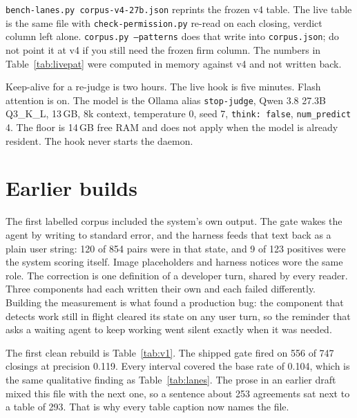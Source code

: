 \texttt{bench-lanes.py corpus-v4-27b.json} reprints the frozen v4
table. The live table is the same file with
\texttt{check-permission.py} re-read on each closing, verdict
column left alone. \texttt{corpus.py --patterns} does that write
into \texttt{corpus.json}; do not point it at v4 if you still need
the frozen firm column. The numbers in Table~\ref{tab:livepat} were
computed in memory against v4 and not written back.

Keep-alive for a re-judge is two hours. The live hook is five
minutes. Flash attention is on. The model is the Ollama alias
\texttt{stop-judge}, Qwen 3.8 27.3B Q3\_K\_L, 13\,GB, 8k context,
temperature 0, seed 7, \texttt{think: false}, \texttt{num\_predict}
4. The floor is 14\,GB free RAM and does not apply when the model
is already resident. The hook never starts the daemon.

\section{Earlier builds}
\label{app:builds}

The first labelled corpus included the system's own output. The gate wakes
the agent by writing to standard error, and the harness feeds that text back
as a plain user string: 120 of 854 pairs were in that state, and 9 of 123
positives were the system scoring itself. Image placeholders and harness
notices wore the same role. The correction is one definition of a developer
turn, shared by every reader. Three components had each written their own
and each failed differently. Building the measurement is what found a
production bug: the component that detects work still in flight cleared its
state on any user turn, so the reminder that asks a waiting agent to keep
working went silent exactly when it was needed.

The first clean rebuild is Table~\ref{tab:v1}. The shipped gate fired on 556
of 747 closings at precision 0.119. Every interval covered the base rate of
0.104, which is the same qualitative finding as Table~\ref{tab:lanes}. The
prose in an earlier draft mixed this file with the next one, so a sentence
about 253 agreements sat next to a table of 293. That is why every table
caption now names the file.

